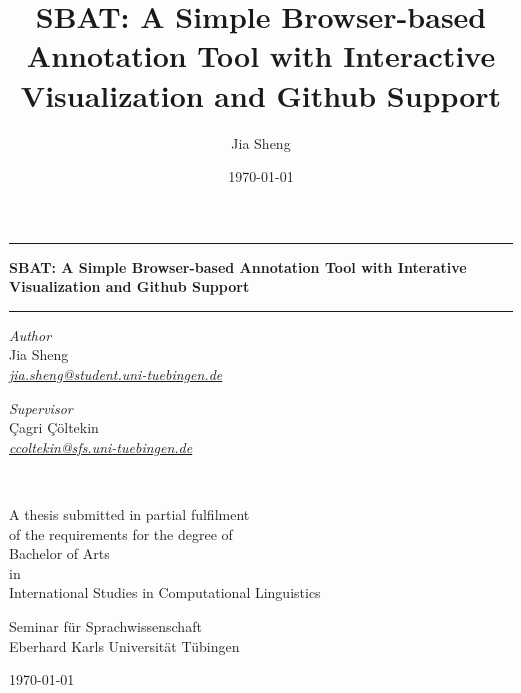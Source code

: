 \documentclass[a4paper]{article}
\title{SBAT: A Simple Browser-based Annotation Tool with Interactive Visualization and Github Support}
\author{Jia Sheng}
\date{\today}
\begin{document}
\begin{titlepage}
\begin{center}

\hrule
\vspace{0.6cm}
{\bfseries\LARGE
SBAT: A Simple Browser-based Annotation Tool with Interative Visualization and Github Support
}\\[1cm]
\hrule
\vspace*{.05\textheight}
 
\begin{minipage}[t]{0.49\textwidth}
\begin{flushleft}
{\large
\textit{Author}\\
Jia Sheng}\\
\href{mailto:jia.sheng@student.uni-tuebingen.de}{\textit{jia.sheng@student.uni-tuebingen.de}}\\
\end{flushleft}
\end{minipage}
\begin{minipage}[t]{0.49\textwidth}
\begin{flushright}
{\large
\textit{Supervisor}\\
Çagri Çöltekin}\\
\href{mailto:ccoltekin@sfs.uni-tuebingen.de}{\textit{ccoltekin@sfs.uni-tuebingen.de}}\\
\end{flushright}
\end{minipage}\\

\vfill

A thesis submitted in partial fulfilment\\
of the requirements for the degree of\\[2mm]
{\large Bachelor of Arts}\\
in\\[1mm]
{\large International Studies in Computational Linguistics}

\vspace*{.1\textheight}

{\large Seminar für Sprachwissenschaft\\
Eberhard Karls Universität Tübingen

\vspace{1em}
\today}
\end{center}
\end{titlepage}

\end{document}
